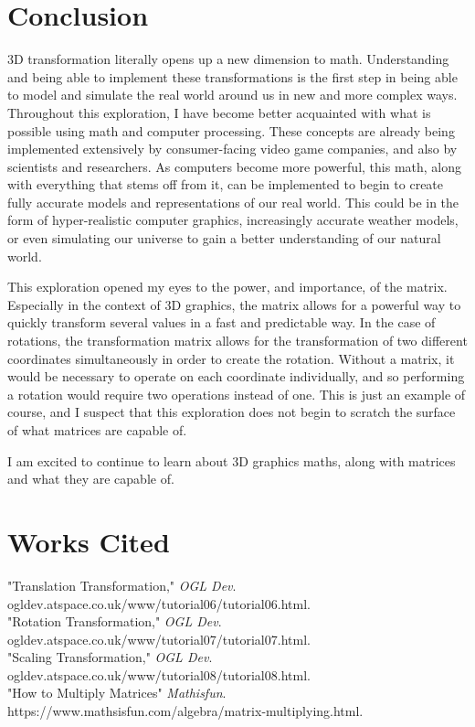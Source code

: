 \documentclass{article}
\begin{document}
	\section{Conclusion}
	3D transformation literally opens up a new dimension to math. Understanding and being able to implement these transformations is the first step in being able to model and simulate the real world around us in new and more complex ways. Throughout this exploration, I have become better acquainted with what is possible using math and computer processing. These concepts are already being implemented extensively by consumer-facing video game companies, and also by scientists and researchers. As computers become more powerful, this math, along with everything that stems off from it, can be implemented to begin to create fully accurate models and representations of our real world. This could be in the form of hyper-realistic computer graphics, increasingly accurate weather models, or even simulating our universe to gain a better understanding of our natural world. \par
	This exploration opened my eyes to the power, and importance, of the matrix. Especially in the context of 3D graphics, the matrix allows for a powerful way to quickly transform several values in a fast and predictable way. In the case of rotations, the transformation matrix allows for the transformation of two different coordinates simultaneously in order to create the rotation. Without a matrix, it would be necessary to operate on each coordinate individually, and so performing a rotation would require two operations instead of one. This is just an example of course, and I suspect that this exploration does not begin to scratch the surface of what matrices are capable of. \par
	I am excited to continue to learn about 3D graphics maths, along with matrices and what they are capable of.

	\newpage

	\section{Works Cited}
	"Translation Transformation," \textit{OGL Dev}. ogldev.atspace.co.uk/www/tutorial06/tutorial06.html. \\
	"Rotation Transformation," \textit{OGL Dev}. ogldev.atspace.co.uk/www/tutorial07/tutorial07.html. \\
	"Scaling Transformation," \textit{OGL Dev}. ogldev.atspace.co.uk/www/tutorial08/tutorial08.html. \\
	"How to Multiply Matrices" \textit{Mathisfun}. https://www.mathsisfun.com/algebra/matrix-multiplying.html.
\end{document}
